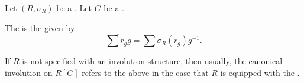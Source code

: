 \begin{definition} \label{definition:canonical_involution_on_a_group_ring_over_a_ring_with_involution}
    Let $(R, \sigma_R)$ be a . Let $G$ be a .

    The   is the  given by
    $$\overline{\sum r_g g} = \sum {\sigma_R(r_g) g^{-1}}.$$

    If $R$ is not specified with an involution structure, then usually, the canonical involution on $R[G]$ refers to the above in the case that $R$ is equipped with the .
\end{definition}
